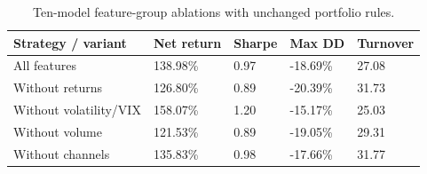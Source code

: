 \begin{table}[htbp]
\caption{Ten-model feature-group ablations with unchanged portfolio rules.}
\label{tab:features-ablation}
\begin{tabular}{lllll}
\toprule
Strategy / variant & Net return & Sharpe & Max DD & Turnover \\
\midrule
All features & 138.98\% & 0.97 & -18.69\% & 27.08 \\
Without returns & 126.80\% & 0.89 & -20.39\% & 31.73 \\
Without volatility/VIX & 158.07\% & 1.20 & -15.17\% & 25.03 \\
Without volume & 121.53\% & 0.89 & -19.05\% & 29.31 \\
Without channels & 135.83\% & 0.98 & -17.66\% & 31.77 \\
\bottomrule
\end{tabular}
\end{table}
